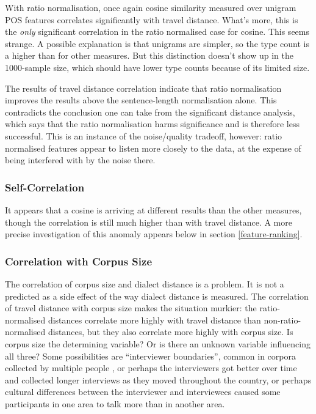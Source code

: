 With ratio normalisation, once again cosine similarity measured over
unigram POS features correlates significantly with travel
distance. What's more, this is the {\it only} significant correlation
in the ratio normalised case for cosine. This seems strange. A
possible explanation is that unigrams are simpler, so the type count
is a higher than for other measures. But this distinction doesn't show up in
the 1000-sample size, which should have lower type counts because of
its limited size.

The results of travel distance correlation indicate that ratio
normalisation improves the results above the sentence-length
normalisation alone. This contradicts the conclusion one can take from
the significant distance analysis, which says that the ratio
normalisation harms significance and is therefore less
successful. This is an instance of the noise/quality tradeoff,
however: ratio normalised features appear to listen more closely to
the data, at the expense of being interfered with by the noise there.

\subsubsection{Self-Correlation}

It appears that a cosine is arriving at different results than the
other measures, though the correlation is still much higher than with
travel distance. A more precise investigation of this anomaly appears
below in section \ref{feature-ranking}.

\subsubsection{Correlation with Corpus Size}

The correlation of corpus size and dialect distance is a problem. It
is not a predicted as a side effect of the way dialect distance is
measured. The correlation of travel distance with corpus size makes
the situation murkier: the ratio-normalised distances correlate more
highly with travel distance than non-ratio-normalised distances, but
they also correlate more highly with corpus size. Is corpus size the
determining variable? Or is there an unknown variable influencing all
three? Some possibilities are ``interviewer boundaries'', common in
corpora collected by multiple people \cite{chambers98}, or perhaps the
interviewers got better over time and collected longer interviews as
they moved throughout the country,
or perhaps cultural differences between the interviewer and
interviewees caused some participants in one area to talk more than in
another area.

